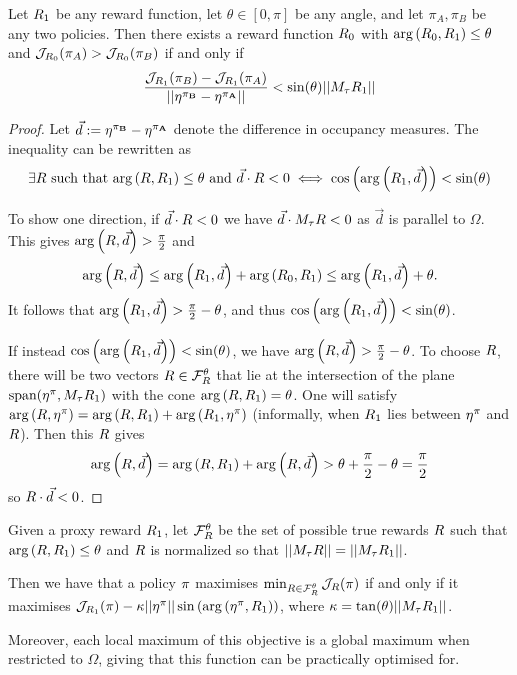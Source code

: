 \begin{theorem}%
Let $R_1$ be any reward function, let $\theta \in [0,\pi]$ be any angle, and let $\pi_A, \pi_B$ be any two policies. Then there exists a reward function $R_0$ with $\mathrm{arg}\left({R_0}, {R_1}\right) \leq \theta$ and $\mathcal{J}_{R_0}(\pi_A) > \mathcal{J}_{R_0}(\pi_B)$ if and only if 
$$
\frac{\mathcal{J}_{R_1}(\pi_B)-\mathcal{J}_{R_1}(\pi_A)}{||\mathbf{\eta^{\pi_B}}-\mathbf{\eta^{\pi_A}}||} < \sin(\theta)||M_\tau R_1||
$$
\end{theorem}
\begin{proof}\label{proof:opt_stop}
Let $\vec{d} := \mathbf{\eta^{\pi_B}}-\mathbf{\eta^{\pi_A}}$ denote the difference in occupancy measures. The inequality can be rewritten as 
$$
\exists R \textrm { such that }  \mathrm{arg}\left({R}, {R_1}\right) \leq \theta\textrm{ and } \vec{d} \cdot R < 0 \iff \cos\left(\mathrm{arg}\left({R_1}, {\vec{d}}\right)\right) < \sin(\theta)
$$ 

To show one direction, if $\vec{d} \cdot R < 0$ we have 
$\vec{d} \cdot M_\tau R < 0$ as $\vec{d}$ is parallel to $\Omega$. This gives
$\mathrm{arg}\left({R}, {\vec{d}}\right) > \frac{\pi}{2}$ and
$$\mathrm{arg}\left({R}, {\vec{d}}\right)\leq \mathrm{arg}\left({R_1}, {\vec{d}}\right)+\mathrm{arg}\left({R_0}, {R_1}\right) \leq \mathrm{arg}\left({R_1}, {\vec{d}}\right)+\theta.$$
It follows that $\mathrm{arg}\left({R_1}, {\vec{d}}\right)> \frac{\pi}{2}-\theta$, and thus $\cos\left(\mathrm{arg}\left({{R_1}}, {{\vec{d}}}\right)\right) < \sin(\theta)$.

If instead $\cos\left(\mathrm{arg}\left({{R_1}}, {{\vec{d}}}\right)\right) < \sin(\theta)$, 
we have $\mathrm{arg}\left({R}, { \vec{d}}\right) > \frac{\pi}{2}-\theta$. To choose $R$, there will be two vectors $R \in \mathcal{F}_{R}^\theta$ that lie at the intersection of the plane $\textrm{span}(\mathbf{\eta^{\pi}}, M_\tau R_1)$ with the cone 
$\mathrm{arg}\left({R}, {R_1}\right) = \theta$. One will satisfy $\mathrm{arg}\left({R}, {\mathbf{\eta^{\pi}}}\right) = \mathrm{arg}\left({R}, {R_1}\right)+\mathrm{arg}\left({R_1}, {\mathbf{\eta^{\pi}}}\right)$ (informally, when $R_1$ lies between $\mathbf{\eta^{\pi}}$ and $R$).
Then this $R$ gives 
$$\mathrm{arg}\left({R}, {\vec{d}}\right) = \mathrm{arg}\left({R}, {R_1}\right)+\mathrm{arg}\left({R}, {\vec{d}}\right) > \theta + \frac{\pi}{2}-\theta = \frac{\pi}{2}$$
so
$R \cdot \vec{d} < 0$. 
\end{proof}
\begin{proposition}\label{thm:regularised_reward}
    Given a proxy reward $R_1$, let $\mathcal{F}_{R}^\theta$ be the set of possible true rewards
    $R$ such that 
    $\mathrm{arg}\left({R}, {R_1}\right) \leq \theta$ and $R$ is normalized so that $||M_\tau R|| = ||M_\tau R_1||$. 
    
    Then we have that a policy $\pi$ maximises $\min_{R \in \mathcal{F}_{R}^\theta}\mathcal{J}_{R}(\pi)$ if and only if it maximises $\mathcal{J}_{R_1}(\pi)- \kappa ||\mathbf{\eta^{\pi}}|| \sin\left(\mathrm{arg}\left({\mathbf{\eta^{\pi}}}, {R_1}\right)\right)$,
    where 
    $\kappa = \tan(\theta)||M_\tau R_1||$.

    Moreover, each local maximum of this objective is a global maximum when restricted to $\Omega$, giving that this function can be practically optimised for.
\end{proposition}
